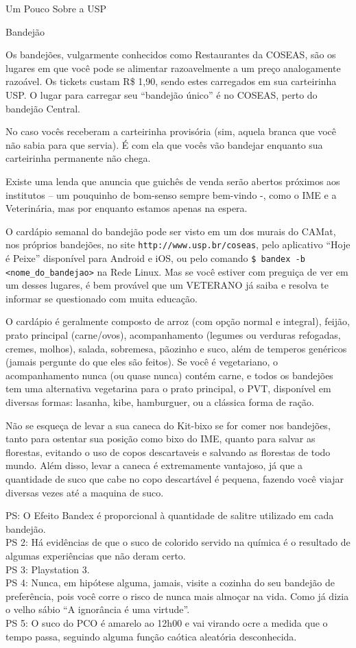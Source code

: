 \begin{secao}{Um Pouco Sobre a USP}
\begin{subsecao}{Bandejão}


Os bandejões, vulgarmente conhecidos como Restaurantes da COSEAS, são os lugares
em que você pode se alimentar razoavelmente a um preço analogamente razoável.
Os tickets custam R\$ 1,90, sendo estes carregados em sua carteirinha USP. O 
lugar para carregar seu ``bandejão único'' é no COSEAS, perto do bandejão 
Central.

No caso vocês receberam a carteirinha provisória (sim, aquela 
branca que você não sabia para que servia). É com ela que vocês vão bandejar
enquanto sua carteirinha permanente não chega.

Existe uma lenda que anuncia que guichês de venda serão abertos próximos aos
institutos – um pouquinho de bom-senso sempre bem-vindo -, como o IME e
a Veterinária, mas por enquanto estamos apenas na espera.

O cardápio semanal do bandejão pode ser visto em um dos murais do CAMat, nos
próprios bandejões, no site {\tt http://www.usp.br/coseas}, pelo aplicativo 
``Hoje é Peixe'' disponível para Android e iOS, ou pelo comando 
{\tt \$ bandex -b <nome\_do\_bandejao>} na Rede Linux. Mas se você estiver
com preguiça de ver em um desses lugares, é bem provável que um VETERANO já saiba
e resolva te informar se questionado com muita educação.

O cardápio é geralmente composto de arroz (com opção normal e integral), feijão,
prato principal (carne/ovos), acompanhamento (legumes ou verduras refogadas, 
cremes, molhos), salada, sobremesa, pãozinho e suco, além de temperos genéricos
(jamais pergunte do que eles são feitos). Se você é vegetariano, o 
acompanhamento nunca (ou quase nunca) contém carne, e todos os bandejões tem uma
alternativa vegetarina para o prato principal, o PVT, disponível em diversas
formas: lasanha, kibe, hamburguer, ou a clássica forma de ração.


Não se esqueça de levar a sua caneca do Kit-bixo se for comer nos bandejões,
tanto para ostentar sua posição como bixo do IME, quanto para salvar as florestas, 
evitando o uso de copos descartaveis e salvando as florestas de todo mundo. Além
disso, levar a caneca é extremamente vantajoso, já que a quantidade de suco que
cabe no copo descartável é pequena, fazendo você viajar diversas vezes até a
maquina de suco.


PS: O Efeito Bandex é proporcional à quantidade de salitre utilizado em cada bandejão.\\
PS 2: Há evidências de que o suco de colorido servido na química é o resultado de algumas
experiências que não deram certo.\\
PS 3: Playstation 3.\\
PS 4: Nunca, em hipótese alguma, jamais, visite a cozinha do seu bandejão de preferência,
pois você corre o risco de nunca mais almoçar na vida. Como já dizia o velho sábio ``A
ignorância é uma virtude''.\\
PS 5: O suco do PCO é amarelo ao 12h00 e vai virando ocre a medida que o tempo passa,
seguindo alguma função caótica aleatória desconhecida.


\end{subsecao}
\end{secao}
